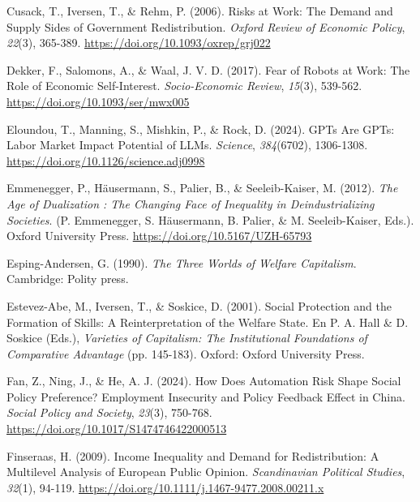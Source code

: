\documentclass[
  spanish,
  12pt,
]{article}
\newlength{\cslhangindent}
\newenvironment{CSLReferences}[2] %
 {\begin{list}{}{%
  \setlength{\itemindent}{0pt}
  \setlength{\leftmargin}{0pt}
  \setlength{\parsep}{0pt}
  \ifodd #1
   \setlength{\leftmargin}{\cslhangindent}
   \setlength{\itemindent}{-1\cslhangindent}
  \fi
  \setlength{\itemsep}{#2\baselineskip}}}
 {\end{list}}
\begin{document}
\begin{CSLReferences}{1}{0}
Cusack, T., Iversen, T., \& Rehm, P. (2006). Risks at {Work}: {The
Demand} and {Supply Sides} of {Government Redistribution}. \emph{Oxford
Review of Economic Policy}, \emph{22}(3), 365-389.
\url{https://doi.org/10.1093/oxrep/grj022}

Dekker, F., Salomons, A., \& Waal, J. V. D. (2017). Fear of Robots at
Work: {The} Role of Economic Self-Interest. \emph{Socio-Economic
Review}, \emph{15}(3), 539-562. \url{https://doi.org/10.1093/ser/mwx005}

Eloundou, T., Manning, S., Mishkin, P., \& Rock, D. (2024). {GPTs} Are
{GPTs}: {Labor} Market Impact Potential of {LLMs}. \emph{Science},
\emph{384}(6702), 1306-1308.
\url{https://doi.org/10.1126/science.adj0998}

Emmenegger, P., Häusermann, S., Palier, B., \& Seeleib-Kaiser, M.
(2012). \emph{The Age of Dualization : {The} Changing Face of Inequality
in Deindustrializing Societies}. (P. Emmenegger, S. Häusermann, B.
Palier, \& M. Seeleib-Kaiser, Eds.). Oxford University Press.
\url{https://doi.org/10.5167/UZH-65793}

Esping-Andersen, G. (1990). \emph{The Three Worlds of Welfare
Capitalism}. Cambridge: Polity press.

Estevez-Abe, M., Iversen, T., \& Soskice, D. (2001). Social Protection
and the Formation of Skills: A Reinterpretation of the Welfare State. En
P. A. Hall \& D. Soskice (Eds.), \emph{Varieties of Capitalism: {The}
Institutional Foundations of Comparative Advantage} (pp. 145-183).
Oxford: Oxford University Press.

Fan, Z., Ning, J., \& He, A. J. (2024). How {Does Automation Risk Shape
Social Policy Preference}? {Employment Insecurity} and {Policy Feedback
Effect} in {China}. \emph{Social Policy and Society}, \emph{23}(3),
750-768. \url{https://doi.org/10.1017/S1474746422000513}

Finseraas, H. (2009). Income {Inequality} and {Demand} for
{Redistribution}: {A Multilevel Analysis} of {European Public Opinion}.
\emph{Scandinavian Political Studies}, \emph{32}(1), 94-119.
\url{https://doi.org/10.1111/j.1467-9477.2008.00211.x}


\end{CSLReferences}
\end{document}
